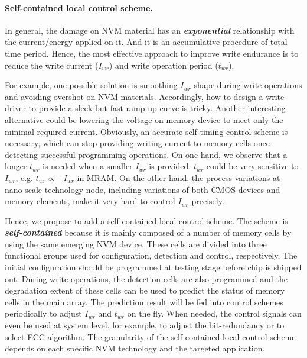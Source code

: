 \paragraph{Self-contained local control scheme.} In general, the damage on NVM material has an \textbf{\emph{exponential}} relationship with the current/energy applied on it. And it is an accumulative procedure of total time period. Hence, the most effective approach to improve write endurance is to reduce the write current ($I_{wr}$) and write operation period ($t_{wr}$).

For example, one possible solution is smoothing $I_{wr}$ shape during write operations and avoiding overshot on NVM materials. Accordingly, how to design a write driver to provide a sleek but fast ramp-up curve is tricky. Another interesting alternative could be lowering the voltage on memory device to meet only the minimal required current. Obviously, an accurate self-timing control scheme is necessary, which can stop providing writing current to memory cells once detecting successful programming operations. On one hand, we observe that a longer $t_{wr}$ is needed when a smaller $I_{wr}$ is provided. $t_{wr}$ could be very sensitive to $I_{wr}$, e.g. $t_{wr}\propto{-I_{wr}}$ in MRAM. On the other hand, the process variations at nano-scale technology node, including variations of both CMOS devices and memory elements, make it very hard to control $I_{wr}$ precisely.

Hence, we propose to add a self-contained local control scheme. The scheme is \emph{\textbf{self-contained}} because it is mainly composed of a number of memory cells by using the same emerging NVM device. These cells are divided into three functional groups used for configuration, detection and control, respectively. The initial configuration should be programmed at testing stage before chip is shipped out. During write operations, the detection cells are also programmed and the degradation extent of these cells can be used to predict the status of memory cells in the main array. The prediction result will be fed into control schemes periodically to adjust $I_{wr}$ and $t_{wr}$ on the fly. When needed, the control signals can even be used at system level, for example, to adjust the bit-redundancy or to select ECC algorithm. The granularity of the self-contained local control scheme depends on each specific NVM technology and the targeted application.

